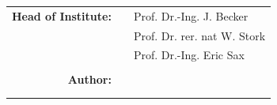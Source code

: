 \begin{titlepage}
\begin{minipage}{15cm}
\begin{tabular}{rcl}
\bfseries Head of Institute:
&& Prof. Dr.-Ing. J. Becker\\
&& Prof. Dr. rer. nat  W. Stork\\
&& Prof. Dr.-Ing. Eric Sax\\
 \\
	\bfseries Author:         && \nameprefix \leerzeichen \docauthor \\
											      && \nameprefixb \leerzeichen \docauthorb\\
														&& \nameprefixc \leerzeichen \docauthorc \\
											      \end{tabular}											
											      
\end{minipage}
\end{titlepage}
\pagestyle{fancy}
